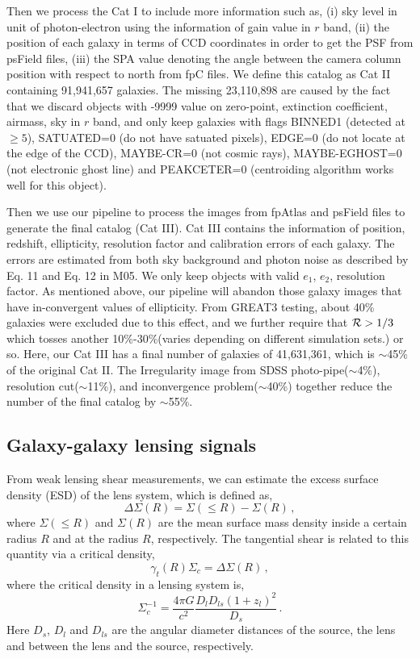 \documentclass[apj]{emulateapj}
\begin{document}
Then we process the Cat I to include more information such as, (i) sky
level in unit of photon-electron using the information of gain value
in $r$ band, (ii) the position of each galaxy in terms of CCD
coordinates in order to get the PSF from psField files, (iii) the SPA
value denoting the angle between the camera column position with
respect to north from fpC files. We define this catalog as Cat II
containing 91,941,657 galaxies. The missing 23,110,898 are caused by
the fact that we discard objects with -9999 value on zero-point,
extinction coefficient, airmass, sky in $r$ band, and only keep
galaxies with flags BINNED1 (detected at $\geq 5$), SATUATED=0 (do not
have satuated pixels), EDGE=0 (do not locate at the edge of the CCD),
MAYBE-CR=0 (not cosmic rays), MAYBE-EGHOST=0 (not electronic ghost
line) and PEAKCETER=0 (centroiding algorithm works well for this
object).

Then we use our pipeline to process the images from fpAtlas and
psField files to generate the final catalog (Cat III). Cat III
contains the information of position, redshift, ellipticity,
resolution factor and calibration errors of each galaxy. The errors
are estimated from both sky background and photon noise as described
by Eq. 11 and Eq. 12 in M05. We only keep objects with valid $e_1$,
$e_2$, resolution factor. As mentioned above, our pipeline will
abandon those galaxy images that have in-convergent values of
ellipticity.  From GREAT3 testing, about 40\% galaxies were excluded
due to this effect, and we further require that ${\cal R}>1/3$ which
tosses another 10\%-30\%(varies depending on different simulation sets.) 
or so. Here, our Cat III has a final number of
galaxies of 41,631,361, which is $\sim$45\% of the original Cat
II. The Irregularity image from SDSS photo-pipe($\sim$4\%), 
resolution cut($\sim$11\%), and
inconvergence problem($\sim$40\%) together reduce the
number of the final catalog by $\sim$55\%. 




\subsection{Galaxy-galaxy lensing signals}

From weak lensing shear measurements, we can estimate the excess
surface density (ESD) of the lens system, which is defined
as,
\begin{equation}
\Delta\Sigma(R)=\Sigma(\leqslant R)-\Sigma(R)\,,
\end{equation}
where $\Sigma(\leqslant R)$ and $\Sigma(R)$ are the mean surface mass
density inside a certain radius $R$ and at the radius $R$,
respectively. The tangential shear is related to this quantity via a
critical density,
\begin{equation}
\gamma_t(R)\Sigma_c=\Delta\Sigma(R)\,,
\label{eq:gamma_R}
\end{equation}
where the  critical density in a lensing system is,
\begin{equation}
\Sigma_c^{-1}=\frac{4\pi G}{c^2}\frac{D_lD_{ls}(1+z_l)^2}{D_s}\,.
\end{equation}
Here $D_s$, $D_l$ and $D_{ls}$ are the angular diameter distances of
the source, the lens and between the lens and the source,
respectively.
\end{document}
